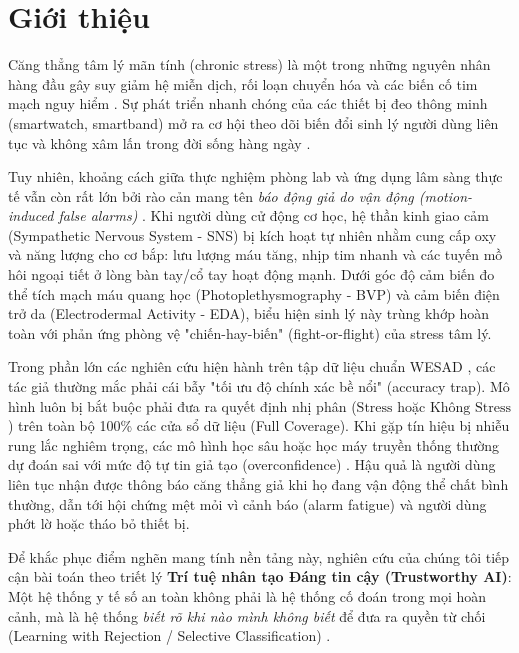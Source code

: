 \documentclass[conference]{IEEEtran}
\begin{document}
\section{Giới thiệu}
Căng thẳng tâm lý mãn tính (chronic stress) là một trong những nguyên nhân hàng đầu gây suy giảm hệ miễn dịch, rối loạn chuyển hóa và các biến cố tim mạch nguy hiểm \cite{can2019stress}. Sự phát triển nhanh chóng của các thiết bị đeo thông minh (smartwatch, smartband) mở ra cơ hội theo dõi biến đổi sinh lý người dùng liên tục và không xâm lấn trong đời sống hàng ngày \cite{schmidt2018wesad, gjoreski2016continuous}.

Tuy nhiên, khoảng cách giữa thực nghiệm phòng lab và ứng dụng lâm sàng thực tế vẫn còn rất lớn bởi rào cản mang tên \textit{báo động giả do vận động (motion-induced false alarms)} \cite{schumm2010effect, zhang2014troika}. Khi người dùng cử động cơ học, hệ thần kinh giao cảm (Sympathetic Nervous System - SNS) bị kích hoạt tự nhiên nhằm cung cấp oxy và năng lượng cho cơ bắp: lưu lượng máu tăng, nhịp tim nhanh và các tuyến mồ hôi ngoại tiết ở lòng bàn tay/cổ tay hoạt động mạnh. Dưới góc độ cảm biến đo thể tích mạch máu quang học (Photoplethysmography - BVP) và cảm biến điện trở da (Electrodermal Activity - EDA), biểu hiện sinh lý này trùng khớp hoàn toàn với phản ứng phòng vệ "chiến-hay-biến" (fight-or-flight) của stress tâm lý. 

Trong phần lớn các nghiên cứu hiện hành trên tập dữ liệu chuẩn WESAD \cite{schmidt2018wesad, bobade2020stress, siirtola2019continuous}, các tác giả thường mắc phải cái bẫy "tối ưu độ chính xác bề nổi" (accuracy trap). Mô hình luôn bị bắt buộc phải đưa ra quyết định nhị phân ($\text{Stress}$ hoặc $\text{Không Stress}$) trên toàn bộ 100\% các cửa sổ dữ liệu (Full Coverage). Khi gặp tín hiệu bị nhiễu rung lắc nghiêm trọng, các mô hình học sâu hoặc học máy truyền thống thường dự đoán sai với mức độ tự tin giả tạo (overconfidence) \cite{guo2017calibration}. Hậu quả là người dùng liên tục nhận được thông báo căng thẳng giả khi họ đang vận động thể chất bình thường, dẫn tới hội chứng mệt mỏi vì cảnh báo (alarm fatigue) và người dùng phớt lờ hoặc tháo bỏ thiết bị.

Để khắc phục điểm nghẽn mang tính nền tảng này, nghiên cứu của chúng tôi tiếp cận bài toán theo triết lý \textbf{Trí tuệ nhân tạo Đáng tin cậy (Trustworthy AI)}: Một hệ thống y tế số an toàn không phải là hệ thống cố đoán trong mọi hoàn cảnh, mà là hệ thống \textit{biết rõ khi nào mình không biết} để đưa ra quyền từ chối (Learning with Rejection / Selective Classification) \cite{chow1970optimum, geifman2017selective, hendrickx2021machine}.
\end{document}
